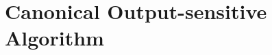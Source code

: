 \section{Canonical Output-sensitive Algorithm}
\begin{frame}\frametitle{\insertsection}\justifying

\end{frame}
